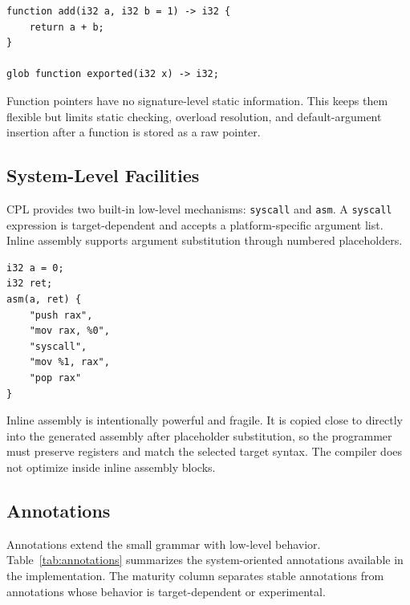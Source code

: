 \documentclass[10pt,twocolumn]{article}
\begin{document}
\begin{lstlisting}[language=CPL, caption={Function forms.}]
function add(i32 a, i32 b = 1) -> i32 {
    return a + b;
}

glob function exported(i32 x) -> i32;
\end{lstlisting}

\par Function pointers have no signature-level static information. This keeps them flexible but limits static checking, overload resolution, and default-argument insertion after a function is stored as a raw pointer.

\subsection{System-Level Facilities}
\par CPL provides two built-in low-level mechanisms: \texttt{syscall} and \texttt{asm}. A \texttt{syscall} expression is target-dependent and accepts a platform-specific argument list. Inline assembly supports argument substitution through numbered placeholders.

\begin{lstlisting}[language=CPL, caption={Inline assembly with placeholders.}]
i32 a = 0;
i32 ret;
asm(a, ret) {
    "push rax",
    "mov rax, %0",
    "syscall",
    "mov %1, rax",
    "pop rax"
}
\end{lstlisting}

\par Inline assembly is intentionally powerful and fragile. It is copied close to directly into the generated assembly after placeholder substitution, so the programmer must preserve registers and match the selected target syntax. The compiler does not optimize inside inline assembly blocks.

\subsection{Annotations}

\par Annotations extend the small grammar with low-level behavior. Table~\ref{tab:annotations} summarizes the system-oriented annotations available in the implementation. The maturity column separates stable annotations from annotations whose behavior is target-dependent or experimental.
\end{document}
